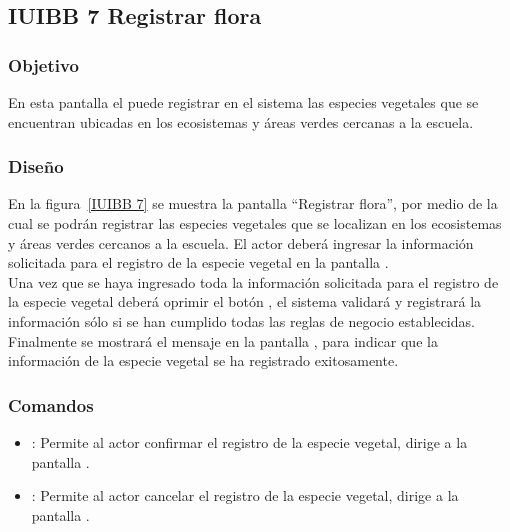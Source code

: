 \subsection{IUIBB 7 Registrar flora}

\subsubsection{Objetivo}

      En esta pantalla el  puede registrar en el sistema las especies vegetales que se encuentran ubicadas en los ecosistemas y áreas verdes cercanas a la escuela.

\subsubsection{Diseño}

    En la figura~\ref{IUIBB 7} se muestra la pantalla ``Registrar flora'', por medio de la cual se podrán registrar las especies vegetales que se localizan en los ecosistemas y áreas verdes cercanos a la escuela. El actor deberá ingresar la información solicitada para el registro de la especie vegetal en la pantalla .\\
        
    Una vez que se haya ingresado toda la información solicitada para el registro de la especie vegetal deberá oprimir el botón , el sistema validará y registrará la información sólo si se han cumplido todas las reglas de negocio establecidas.\\
    
    Finalmente se mostrará el mensaje  en la pantalla , para indicar que la información de la especie vegetal se ha registrado exitosamente.
      



\subsubsection{Comandos}
    \begin{itemize}
	\item {}: Permite al actor confirmar el registro de la especie vegetal, dirige a la pantalla .
	\item {}: Permite al actor cancelar el registro de la especie vegetal, dirige a la pantalla .
    \end{itemize}

